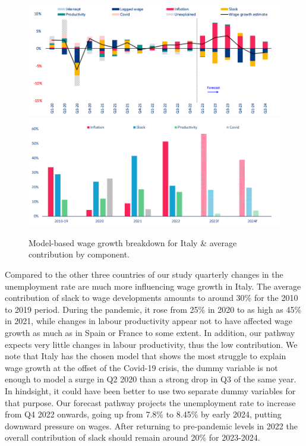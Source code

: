 \begin{figure}[H]
    \centering
    \caption{Model-based wage growth breakdown for Italy \& average contribution by component.}
    \includegraphics[width=.8\textwidth]{Core/2.Labour/img/italyb1.png}
    \includegraphics[width=.8\textwidth]{Core/2.Labour/img/italyb2.png}
    \label{figure:itbreakdown}
\end{figure}
\newpage

Compared to the other three countries of our study quarterly changes in the unemployment rate are much more influencing wage growth in Italy. 
The average contribution of slack to wage developments amounts to around 30\% for the 2010 to 2019 period. 
During the pandemic, it rose from 25\% in 2020 to as high as 45\% in 2021, while changes in labour productivity appear not to have affected wage growth as much as in Spain or France to some extent. 
In addition, our pathway expects very little changes in labour productivity, thus the low contribution. 
We note that Italy has the chosen model that shows the most struggle to explain wage growth at the offset of the Covid-19 crisis, the dummy variable is not enough to model a surge in Q2 2020 than a strong drop in Q3 of the same year. 
In hindsight, it could have been better to use two separate dummy variables for that purpose. 
Our forecast pathway projects the unemployment rate to increase from Q4 2022 onwards, going up from 7.8\% to 8.45\% by early 2024, putting downward pressure on wages. 
After returning to pre-pandemic levels in 2022 the overall contribution of slack should remain around 20\% for 2023-2024. 


